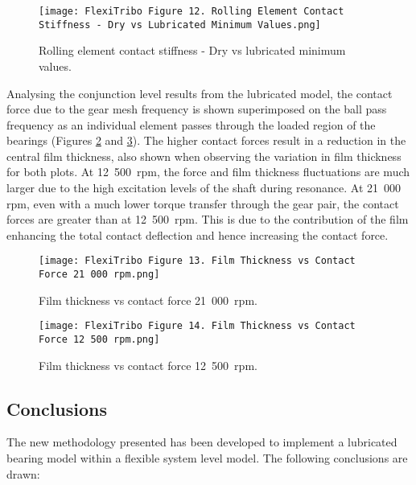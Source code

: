 \begin{figure}
	\centering  
	\texttt{[image: FlexiTribo Figure 12. Rolling Element Contact Stiffness - Dry vs Lubricated Minimum Values.png]}
	\caption{Rolling element contact stiffness - Dry vs lubricated minimum values.}
	\label{Rolling element contact stiffness - Dry vs lubricated minimum values}
\end{figure}

Analysing the conjunction level results from the lubricated model, the contact force due to the gear mesh frequency is shown superimposed on the ball pass frequency as an individual element passes through the loaded region of the bearings (Figures \ref{Film thickness vs contact force 21 000 rpm} and \ref{Film thickness vs contact force 12 500 rpm}). The higher contact forces result in a reduction in the central film thickness, also shown when observing the variation in film thickness for both plots. At 12~500~$\mathrm{rpm}$, the force and film thickness fluctuations are much larger due to the high excitation levels of the shaft during resonance. At 21~000~$\mathrm{rpm}$, even with a much lower torque transfer through the gear pair, the contact forces are greater than at 12~500~$\mathrm{rpm}$. This is due to the contribution of the film enhancing the total contact deflection and hence increasing the contact force.

\begin{figure}
	\centering  
	\texttt{[image: FlexiTribo Figure 13. Film Thickness vs Contact Force 21 000 rpm.png]}
	\caption{Film thickness vs contact force 21~000~$\mathrm{rpm}$.}
	\label{Film thickness vs contact force 21 000 rpm}
\end{figure}

\begin{figure}
	\centering  
	\texttt{[image: FlexiTribo Figure 14. Film Thickness vs Contact Force 12 500 rpm.png]}
	\caption{Film thickness vs contact force 12~500~$\mathrm{rpm}$.}
	\label{Film thickness vs contact force 12 500 rpm}
\end{figure}

\subsection{Conclusions}

The new methodology presented has been developed to implement a lubricated bearing model within a flexible system level model. The following conclusions are drawn:

